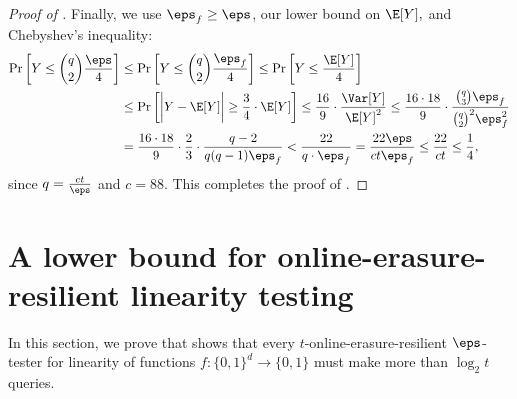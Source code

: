 \documentclass{toc}
\begin{document}
\begin{proof}[Proof of ]
Finally, we use $\eps_f \geq \eps$, our lower bound on $\E[Y],$ and Chebyshev's inequality:
\begin{align*}  %
%
\Pr \bigg[Y \leq \binom{q}{2} \frac{\eps}{4} \bigg] &\leq \Pr \bigg[Y \leq \binom{q}{2}\frac{\eps_f}{4} \bigg] \leq  
                                                      \Pr\bigg[Y \leq \frac{\E[Y]}{4}\bigg]\\
                                                    & \leq \Pr\bigg[\bigg|Y -\E[Y]\bigg| \geq \frac 3 4 \cdot{\E[Y]}\bigg]
                                                    \leq \frac{16}9\cdot \frac{\Var[Y]}{\E[Y]^2} 
    \leq \frac {16\cdot 18} 9 \cdot \frac{\binom{q}{3}\eps_f}{\binom{q}{2}^2\eps_f^2} \\
    &= \frac {16\cdot 18} 9\cdot \frac 2 3 \cdot \frac{q-2}{q(q-1) \eps_f} 
  < \frac{22}{q\cdot \eps_f} = \frac{22\eps}{ct\eps_f} \leq \frac{22}{ct} \leq \frac{1}{4},
\end{align*}
since $q= \frac{ct}{\eps}$ and  $c=88$. This completes the proof of .
\end{proof}

%
\section{A lower bound for online-erasure-resilient linearity testing}\label{sec:linearity_lower}

In this section, we prove  that 
shows that every $t$-online-erasure-resilient $\eps$-tester for linearity of functions $f \colon \{0,1\}^d\to \{0,1\}$ must make more than $\log_2 t$ queries.
\end{document}
